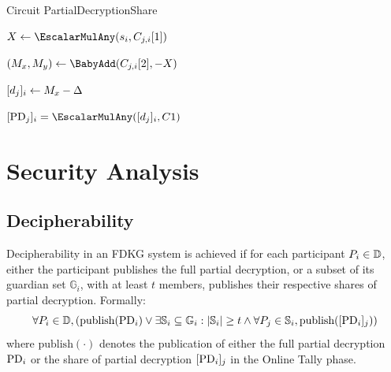 \documentclass[runningheads]{llncs}
\begin{document}
\begin{algorithm}[H]
\caption{Circuit PartialDecryptionShare}
\label{alg:circuit_proof_pds}


\BlankLine

$X \leftarrow \EscalarMulAny(\PartySecretKey{i}, \EncryptedPartialDecryptionKeyShare{j}{i}[1])$\; %

$(M_x, M_y) \leftarrow \BabyAdd(\EncryptedPartialDecryptionKeyShare{j}{i}[2], - X)$\; %

$[d_{j}]_{i} \leftarrow M_x - \Delta$\;

\Assert $\SharePartialDecryptionFromTo{j}{i} = \EscalarMulAny(\PartialDecryptionKeyShare{j}{i}, \TotalA{})$
\end{algorithm}


\section{Security Analysis}


\subsection*{Decipherability}

\begin{definition}[Decipherability] \label{def:decipherability}
    Decipherability in an FDKG system is achieved if for each participant $P_{i} \in \mathbb{D}$, either the participant publishes the full partial decryption, or a subset of its guardian set $\mathbb{G}_i$, with at least $t$ members, publishes their respective shares of partial decryption. Formally: 
    \[
    \forall P_{i} \in \mathbb{D}, \left( \textrm{publish}(\mathrm{PD}_{i}) \lor \exists \mathbb{S}_i \subseteq \mathbb{G}_i : |\mathbb{S}_i| \geq t \land \forall P_{j} \in \mathbb{S}_i, \textrm{publish}([\mathrm{PD}_{i}]_{j}) \right)
    \]
    where \(\textrm{publish}(\cdot)\) denotes the publication of either the full partial decryption $\mathrm{PD}_{i}$ or the share of partial decryption $[\mathrm{PD}_{i}]_{j}$ in the Online Tally phase.
\end{definition}
\end{document}
